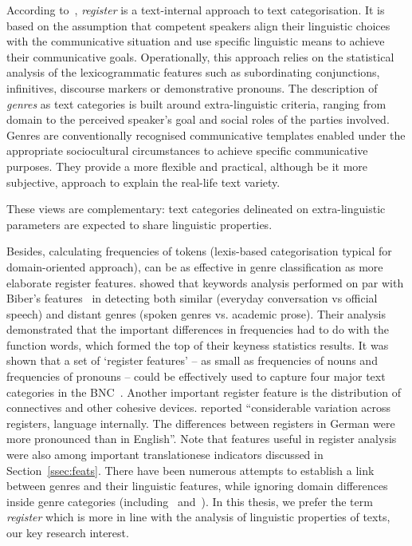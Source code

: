 According to~\citet{Lee01}, \textit{register} is a text-internal approach to text categorisation. It is based on the assumption that competent speakers align their linguistic choices with the communicative situation and use specific linguistic means to achieve their communicative goals. Operationally, this approach relies on the statistical analysis of the lexicogrammatic features such as subordinating conjunctions, infinitives, discourse markers or demonstrative pronouns. %
The description of \textit{genres} as text categories is built around extra-linguistic criteria, ranging from domain to the perceived speaker's goal and social roles of the parties involved. Genres are conventionally recognised communicative templates enabled under the appropriate sociocultural circumstances to achieve specific communicative purposes. They provide a more flexible and practical, although be it more subjective, approach to explain the real-life text variety. 

These views are complementary: text categories delineated on extra-linguistic parameters are expected to share linguistic properties. 

Besides, calculating frequencies of tokens (lexis-based categorisation typical for domain-oriented approach), can be as effective in genre classification as more elaborate register features. \citet{Xiao2005} showed that keywords analysis performed on par with Biber's features~\cite{Biber1988} in detecting both similar (everyday conversation vs official speech) and distant genres (spoken genres vs. academic prose). Their analysis demonstrated that the important differences in frequencies had to do with the function words, which formed the top of their keyness statistics results. It was shown that a set of `register features' -- as small as frequencies of nouns and frequencies of pronouns -- could be effectively used to capture four major text categories in the BNC~\cite{Lijffijt2017}. Another important register feature is the distribution of connectives and other cohesive devices. \citet[p.286]{Kunz2017} reported ``considerable variation across registers, language internally. The differences between registers in German were more pronounced than in English''. Note that features useful in register analysis were also among important translationese indicators discussed in Section~\ref{ssec:feats}. 
There have been numerous attempts to establish a link between genres and their linguistic features, while ignoring domain differences inside genre categories (including~\citet{Lee01} and~\citet{Braslavski2010}). 
In this thesis, we prefer the term \textit{register} which is more in line with the analysis of linguistic properties of texts, our key research interest.

